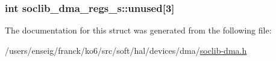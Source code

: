 \hypertarget{structsoclib__dma__regs__s_a402da684971c594fccc19d816236524a}{
\subsubsection[{unused}]{\setlength{\rightskip}{0pt plus 5cm}int soclib\-\_\-dma\-\_\-regs\-\_\-s\-::unused\mbox{[}3\mbox{]}}}\label{structsoclib__dma__regs__s_a402da684971c594fccc19d816236524a}


The documentation for this struct was generated from the following file\-:\begin{DoxyCompactItemize}
\item 
/users/enseig/franck/ko6/src/soft/hal/devices/dma/\hyperlink{soclib-dma_8h}{soclib-\/dma.\-h}\end{DoxyCompactItemize}
